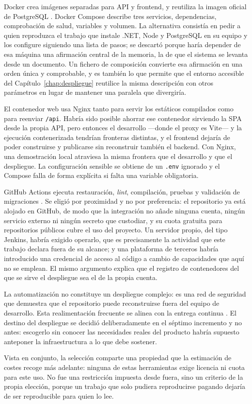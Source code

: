 Docker crea imágenes separadas para API y frontend, y reutiliza la imagen oficial de PostgreSQL \cite{docker}. Docker Compose describe tres servicios, dependencias, comprobación de salud, variables y volumen. La alternativa consistía en pedir a quien reproduzca el trabajo que instale .NET, Node y PostgreSQL en su equipo y los configure siguiendo una lista de pasos; se descartó porque haría depender de esa máquina una afirmación central de la memoria, la de que el sistema se levanta desde un documento. Un fichero de composición convierte esa afirmación en una orden única y comprobable, y es también lo que permite que el entorno accesible del Capítulo~\ref{chap:despliegue} reutilice la misma descripción con otros parámetros en lugar de mantener una paralela que divergiría.

El contenedor web usa Nginx tanto para servir los estáticos compilados como para reenviar \texttt{/api}. Habría sido posible ahorrar ese contenedor sirviendo la SPA desde la propia API, pero entonces el desarrollo ---donde el proxy es Vite--- y la ejecución contenerizada tendrían fronteras distintas, y el frontend dejaría de poder construirse y publicarse sin reconstruir también el backend. Con Nginx, una demostración local atraviesa la misma frontera que el desarrollo y que el despliegue. La configuración sensible se obtiene de un \texttt{.env} ignorado y el Compose falla de forma explícita si falta una variable obligatoria.

GitHub Actions ejecuta restauración, \emph{lint}, compilación, pruebas y validación de migraciones \cite{githubactions}. Se eligió por proximidad y no por preferencia: el repositorio ya está alojado en GitHub, de modo que la integración no añade ninguna cuenta, ningún servicio externo ni ningún secreto que custodiar, y su cuota gratuita para repositorios públicos cubre el uso del proyecto. Un servidor propio, del tipo Jenkins, habría exigido operarlo, que es precisamente la actividad que este trabajo declara fuera de su alcance; y una plataforma de terceros habría introducido una credencial de acceso al código a cambio de capacidades que aquí no se emplean. El mismo argumento explica que el registro de contenedores del que se sirve el despliegue sea el de la propia cuenta.

La automatización no constituye un despliegue complejo: es una red de seguridad que demuestra que el repositorio puede reconstruirse fuera del equipo de desarrollo. Esta realimentación frecuente se alinea con la entrega continua \cite{humble2010}. El destino del despliegue se decidió deliberadamente en el séptimo incremento y no antes: escogerlo sin conocer las necesidades reales del producto habría supuesto anteponer la infraestructura a lo que debe sostener.

Vista en conjunto, la selección comparte una propiedad que la estimación de costes recoge más adelante: ninguna de estas herramientas exige licencia ni cuota para este uso. No fue una restricción impuesta desde fuera, sino un criterio de la propia elección, porque un trabajo que solo pudiera reproducirse pagando dejaría de ser reproducible para quien lo lee.
